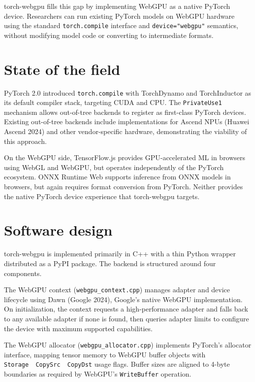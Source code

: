 torch-webgpu fills this gap by implementing WebGPU as a native PyTorch
device. Researchers can run existing PyTorch models on WebGPU hardware
using the standard \texttt{torch.compile} interface and
\texttt{device="webgpu"} semantics, without modifying model code or
converting to intermediate formats.

\section{State of the field}\label{state-of-the-field}

PyTorch 2.0 introduced \texttt{torch.compile} with TorchDynamo and
TorchInductor as its default compiler stack, targeting CUDA and CPU. The
\texttt{PrivateUse1} mechanism allows out-of-tree backends to register
as first-class PyTorch devices. Existing out-of-tree backends include
implementations for Ascend NPUs (Huawei Ascend 2024) and other
vendor-specific hardware, demonstrating the viability of this approach.

On the WebGPU side, TensorFlow.js provides GPU-accelerated ML in
browsers using WebGL and WebGPU, but operates independently of the
PyTorch ecosystem. ONNX Runtime Web supports inference from ONNX models
in browsers, but again requires format conversion from PyTorch. Neither
provides the native PyTorch device experience that torch-webgpu targets.

\section{Software design}\label{software-design}

torch-webgpu is implemented primarily in C++ with a thin Python wrapper
distributed as a PyPI package. The backend is structured around four
components.

The WebGPU context (\texttt{webgpu\_context.cpp}) manages adapter and
device lifecycle using Dawn (Google 2024), Google's native WebGPU
implementation. On initialization, the context requests a
high-performance adapter and falls back to any available adapter if none
is found, then queries adapter limits to configure the device with
maximum supported capabilities.

The WebGPU allocator (\texttt{webgpu\_allocator.cpp}) implements
PyTorch's allocator interface, mapping tensor memory to WebGPU buffer
objects with \texttt{Storage\ \textbar{}\ CopySrc\ \textbar{}\ CopyDst}
usage flags. Buffer sizes are aligned to 4-byte boundaries as required
by WebGPU's \texttt{WriteBuffer} operation.

